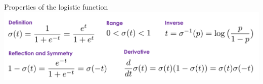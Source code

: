 \documentclass[aspectratio=169]{../latex_main/tntbeamer}  %
\begin{document}
	
	\begin{frame}{Properties of the logistic function}
	   \centering
        \includegraphics[scale=.7]{Bild11}
	\end{frame}
	
	
	
\end{document}
